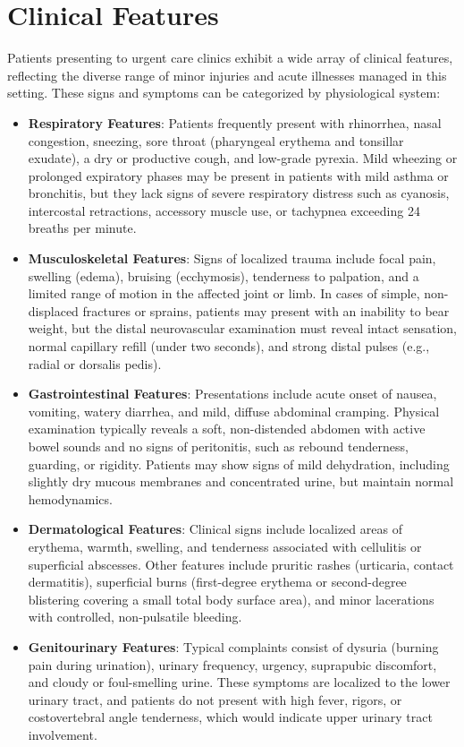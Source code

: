 \section*{Clinical Features}
Patients presenting to urgent care clinics exhibit a wide array of clinical features, reflecting the diverse range of minor injuries and acute illnesses managed in this setting. These signs and symptoms can be categorized by physiological system:

\begin{itemize}
  \item \textbf{Respiratory Features}: Patients frequently present with rhinorrhea, nasal congestion, sneezing, sore throat (pharyngeal erythema and tonsillar exudate), a dry or productive cough, and low-grade pyrexia. Mild wheezing or prolonged expiratory phases may be present in patients with mild asthma or bronchitis, but they lack signs of severe respiratory distress such as cyanosis, intercostal retractions, accessory muscle use, or tachypnea exceeding 24 breaths per minute.
  \item \textbf{Musculoskeletal Features}: Signs of localized trauma include focal pain, swelling (edema), bruising (ecchymosis), tenderness to palpation, and a limited range of motion in the affected joint or limb. In cases of simple, non-displaced fractures or sprains, patients may present with an inability to bear weight, but the distal neurovascular examination must reveal intact sensation, normal capillary refill (under two seconds), and strong distal pulses (e.g., radial or dorsalis pedis).
  \item \textbf{Gastrointestinal Features}: Presentations include acute onset of nausea, vomiting, watery diarrhea, and mild, diffuse abdominal cramping. Physical examination typically reveals a soft, non-distended abdomen with active bowel sounds and no signs of peritonitis, such as rebound tenderness, guarding, or rigidity. Patients may show signs of mild dehydration, including slightly dry mucous membranes and concentrated urine, but maintain normal hemodynamics.
  \item \textbf{Dermatological Features}: Clinical signs include localized areas of erythema, warmth, swelling, and tenderness associated with cellulitis or superficial abscesses. Other features include pruritic rashes (urticaria, contact dermatitis), superficial burns (first-degree erythema or second-degree blistering covering a small total body surface area), and minor lacerations with controlled, non-pulsatile bleeding.
  \item \textbf{Genitourinary Features}: Typical complaints consist of dysuria (burning pain during urination), urinary frequency, urgency, suprapubic discomfort, and cloudy or foul-smelling urine. These symptoms are localized to the lower urinary tract, and patients do not present with high fever, rigors, or costovertebral angle tenderness, which would indicate upper urinary tract involvement.
\end{itemize}


